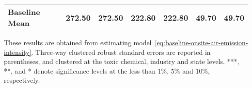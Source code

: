 \begin{table}[H]
{\begin{tabular}{@{}lllllll@{}}
            Baseline Mean                 & 272.50    & 272.50    & 222.80    & 222.80    & 49.70     & 49.70     \\ \bottomrule\bottomrule
        \end{tabular}%
    }
    \begin{minipage}{18cm}
        \vspace{0.05in}
        These results are obtained from estimating model~\ref{eq:baseline-onsite-air-emission-intensity}. Three-way clustered robust standard errors are reported in parentheses, and clustered at the toxic chemical, industry and state levels. ***, **, and * denote significance levels at the less than $1\%$, $5\%$ and $10\%$, respectively.
    \end{minipage}
\end{table}